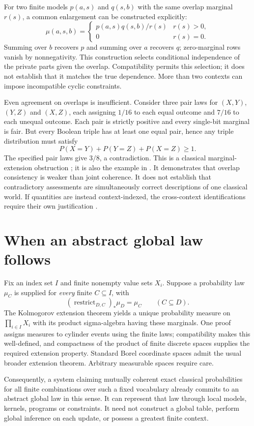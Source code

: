\documentclass[11pt]{article}
\begin{document}
For two finite models $p(a,s)$ and $q(s,b)$ with the same overlap marginal
$r(s)$, a common enlargement can be constructed explicitly:
\[
 \mu(a,s,b)=\begin{cases}p(a,s)q(s,b)/r(s)&r(s)>0,\\0&r(s)=0.\end{cases}
\]
Summing over $b$ recovers $p$ and summing over $a$ recovers $q$; zero-marginal
rows vanish by nonnegativity. This construction selects conditional independence
of the private parts given the overlap. Compatibility permits this selection;
it does not establish that it matches the true dependence. More than two
contexts can impose incompatible cyclic constraints.

Even agreement on overlaps is insufficient. Consider three pair laws for
$(X,Y)$, $(Y,Z)$ and $(X,Z)$, each assigning $1/16$ to each equal outcome and
$7/16$ to each unequal outcome. Each pair is strictly positive and every
single-bit marginal is fair. But every Boolean triple has at least one equal
pair, hence any triple distribution must satisfy
\[
 P(X=Y)+P(Y=Z)+P(X=Z)\geq1.
\]
The specified pair laws give $3/8$, a contradiction. This is a classical
marginal-extension obstruction \cite{vorobev}; it is also the example in
\cite[Theorem 4.3]{omega}. It demonstrates that overlap consistency is weaker
than joint coherence. It does not establish that contradictory assessments
are simultaneously correct descriptions of one classical world. If quantities
are instead context-indexed, the cross-context identifications require their
own justification \cite{abramsky}.

\section{When an abstract global law follows}
Fix an index set $I$ and finite nonempty value sets $X_i$. Suppose a probability
law $\mu_C$ is supplied for \emph{every} finite $C\subseteq I$, with
\[
 (\operatorname{restrict}_{D,C})_*\mu_D=\mu_C\qquad(C\subseteq D).
\]
The Kolmogorov extension theorem yields a unique probability measure on
$\prod_{i\in I}X_i$ with its product sigma-algebra having these marginals.
One proof assigns measures to cylinder events using the finite laws;
compatibility makes this well-defined, and compactness of the product of finite
discrete spaces supplies the required extension property. Standard Borel
coordinate spaces admit the usual broader extension theorem. Arbitrary
measurable spaces require care.

Consequently, a system claiming mutually coherent exact classical probabilities
for all finite combinations over such a fixed vocabulary already commits to
an abstract global law in this sense. It can represent that law through local
models, kernels, programs or constraints. It need not construct a global table,
perform global inference on each update, or possess a greatest finite context.
\end{document}
